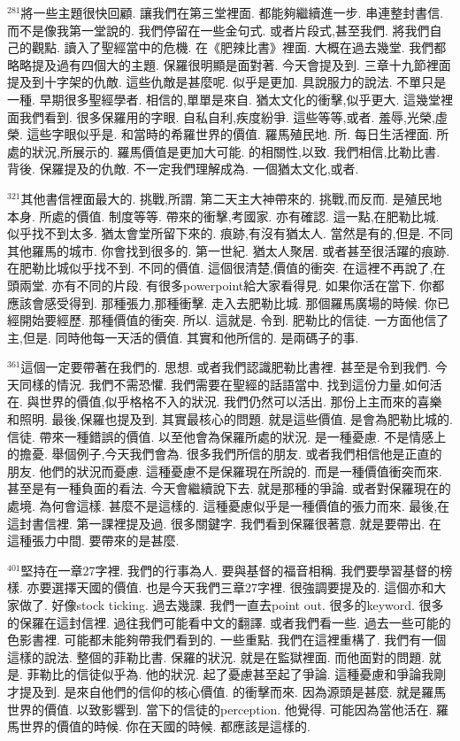 \documentclass{book}
\begin{document}
$^{281}$將一些主題很快回顧.
讓我們在第三堂裡面.
都能夠繼續進一步.
串連整封書信.
而不是像我第一堂說的.
我們停留在一些金句式.
或者片段式,甚至我們.
將我們自己的觀點.
讀入了聖經當中的危機.
在《肥辣比書》裡面.
大概在過去幾堂.
我們都略略提及過有四個大的主題.
保羅很明顯是面對著.
今天會提及到.
三章十九節裡面提及到十字架的仇敵.
這些仇敵是甚麼呢.
似乎是更加.
具說服力的說法.
不單只是一種.
早期很多聖經學者.
相信的,單單是來自.
猶太文化的衝擊,似乎更大.
這幾堂裡面我們看到.
很多保羅用的字眼.
自私自利,疾度紛爭.
這些等等,或者.
羞辱,光榮,虛榮.
這些字眼似乎是.
和當時的希羅世界的價值.
羅馬殖民地.
所.
每日生活裡面.
所處的狀況,所展示的.
羅馬價值是更加大可能.
的相關性,以致.
我們相信,比勒比書.
背後.
保羅提及的仇敵.
不一定我們理解成為.
一個猶太文化,或者.

$^{321}$其他書信裡面最大的.
挑戰,所謂.
第二天主大神帶來的.
挑戰,而反而.
是殖民地本身.
所處的價值.
制度等等.
帶來的衝擊,考國家.
亦有確認.
這一點,在肥勒比城.
似乎找不到太多.
猶太會堂所留下來的.
痕跡,有沒有猶太人.
當然是有的,但是.
不同其他羅馬的城市.
你會找到很多的.
第一世紀.
猶太人聚居.
或者甚至很活躍的痕跡.
在肥勒比城似乎找不到.
不同的價值.
這個很清楚,價值的衝突.
在這裡不再說了,在頭兩堂.
亦有不同的片段.
有很多powerpoint給大家看得見.
如果你活在當下.
你都應該會感受得到.
那種張力,那種衝擊.
走入去肥勒比城.
那個羅馬廣場的時候.
你已經開始要經歷.
那種價值的衝突.
所以.
這就是.
令到.
肥勒比的信徒.
一方面他信了主,但是.
同時他每一天活的價值.
其實和他所信的.
是兩碼子的事.

$^{361}$這個一定要帶著在我們的.
思想.
或者我們認識肥勒比書裡.
甚至是令到我們.
今天同樣的情況.
我們不需恐懼.
我們需要在聖經的話語當中.
找到這份力量,如何活在.
與世界的價值,似乎格格不入的狀況.
我們仍然可以活出.
那份上主而來的喜樂和照明.
最後,保羅也提及到.
其實最核心的問題.
就是這些價值.
是會為肥勒比城的.
信徒.
帶來一種錯誤的價值.
以至他會為保羅所處的狀況.
是一種憂慮.
不是情感上的擔憂.
舉個例子,今天我們會為.
很多我們所信的朋友.
或者我們相信他是正直的朋友.
他們的狀況而憂慮.
這種憂慮不是保羅現在所說的.
而是一種價值衝突而來.
甚至是有一種負面的看法.
今天會繼續說下去.
就是那種的爭論.
或者對保羅現在的處境.
為何會這樣.
甚麼不是這樣的.
這種憂慮似乎是一種價值的張力而來.
最後,在這封書信裡.
第一課裡提及過.
很多關鍵字.
我們看到保羅很著意.
就是要帶出.
在這種張力中間.
要帶來的是甚麼.

$^{401}$堅持在一章27字裡.
我們的行事為人.
要與基督的福音相稱.
我們要學習基督的榜樣.
亦要選擇天國的價值.
也是今天我們三章27字裡.
很強調要提及的.
這個亦和大家做了.
好像stock ticking.
過去幾課.
我們一直去point out.
很多的keyword.
很多的保羅在這封信裡.
過往我們可能看中文的翻譯.
或者我們看一些.
過去一些可能的色影書裡.
可能都未能夠帶我們看到的.
一些重點.
我們在這裡重構了.
我們有一個這樣的說法.
整個的菲勒比書.
保羅的狀況.
就是在監獄裡面.
而他面對的問題.
就是.
菲勒比的信徒似乎為.
他的狀況.
起了憂慮甚至起了爭論.
這種憂慮和爭論我剛才提及到.
是來自他們的信仰的核心價值.
的衝擊而來.
因為源頭是甚麼.
就是羅馬世界的價值.
以致影響到.
當下的信徒的perception.
他覺得.
可能因為當他活在.
羅馬世界的價值的時候.
你在天國的時候.
都應該是這樣的.
\end{document}
